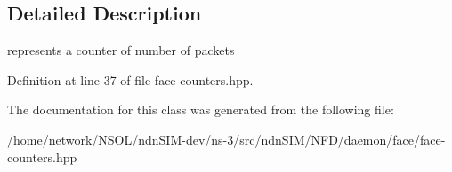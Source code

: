 \subsection{Detailed Description}
represents a counter of number of packets 

Definition at line 37 of file face-\/counters.\+hpp.



The documentation for this class was generated from the following file\+:\begin{DoxyCompactItemize}
\item 
/home/network/\+N\+S\+O\+L/ndn\+S\+I\+M-\/dev/ns-\/3/src/ndn\+S\+I\+M/\+N\+F\+D/daemon/face/face-\/counters.\+hpp\end{DoxyCompactItemize}
